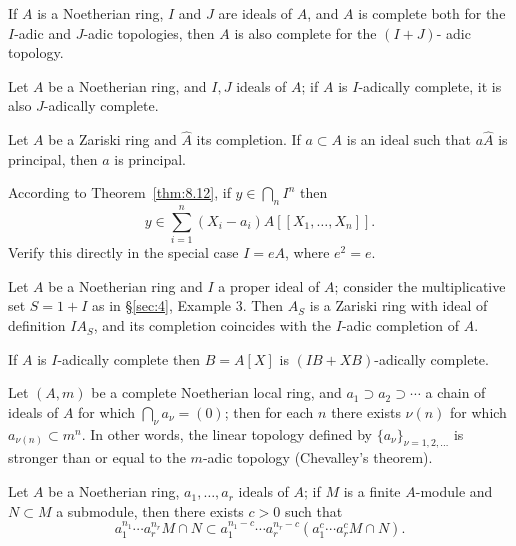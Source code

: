 \begin{exercise}\label{ex:8.1-ex}
If $A$ is a Noetherian ring, $I$ and $J$ are ideals of $A$, and $A$ is complete both for
the $I$-adic and $J$-adic topologies, then $A$ is also complete for the $(I + J)$-
adic topology.
\end{exercise}

\begin{exercise}\label{ex:8.2-ex}
Let $A$ be a Noetherian ring, and $I, J$ ideals of $A$; if $A$ is $I$-adically
complete, it is also $J$-adically complete.
\end{exercise}

\begin{exercise}\label{ex:8.3-ex}
Let $A$ be a Zariski ring and $\hat{A}$ its completion. If $a \subset A$ is an ideal such that
$a\hat{A}$ is principal, then $a$ is principal.
\end{exercise}

\begin{exercise}\label{ex:8.4-ex}
According to Theorem~\ref{thm:8.12}, if $y \in \bigcap_{n} I^n$ then
\[
  y \in \sum_{i=1}^{n} (X_i - a_i)A[[X_1, \ldots, X_n]].
\]
Verify this directly in the special case $I = eA$, where $e^2 = e$.
\end{exercise}

\begin{exercise}\label{ex:8.5-ex}
Let $A$ be a Noetherian ring and $I$ a proper ideal of $A$; consider the
multiplicative set $S = 1 + I$ as in \S\ref{sec:4}, Example 3. Then $A_S$ is a Zariski ring
with ideal of definition $IA_S$, and its completion coincides with the $I$-adic
completion of $A$.
\end{exercise}

\begin{exercise}\label{ex:8.6-ex}
If $A$ is $I$-adically complete then $B = A[X]$ is $(IB + XB)$-adically complete.
\end{exercise}

\begin{exercise}\label{ex:8.7-ex}
Let $(A, m)$ be a complete Noetherian local ring, and $a_1 \supset a_2 \supset \cdots$ a chain of
ideals of $A$ for which $\bigcap_\nu a_\nu = (0)$; then for each $n$ there exists $\nu(n)$ for which
$a_{\nu(n)} \subset m^n$. In other words, the linear topology defined by $\{a_\nu\}_{\nu=1,2,\ldots}$ is
stronger than or equal to the $m$-adic topology (Chevalley's theorem).
\end{exercise}

\begin{exercise}\label{ex:8.8-ex}
Let $A$ be a Noetherian ring, $a_1, \ldots, a_r$ ideals of $A$; if $M$ is a finite $A$-module
and $N \subset M$ a submodule, then there exists $c > 0$ such that
\[
  a_1^{n_1} \cdots a_r^{n_r}M \cap N \subset a_1^{n_1-c} \cdots a_r^{n_r-c}(a_1^c \cdots a_r^c M \cap N).
\]
\end{exercise}

